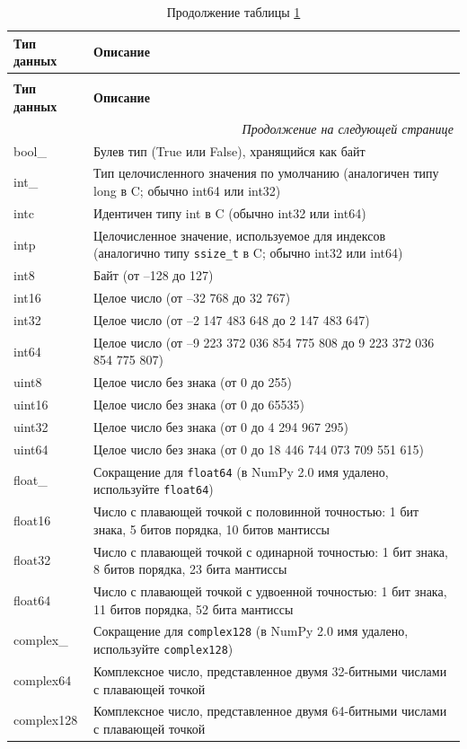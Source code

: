 \documentclass[pract]{SCWorks}
\begin{document}
\begin{longtable}{|p{2.4cm}|p{14cm}|}
\caption{Стандартные типы данных библиотеки NumPy} \label{tab:numpy-types} \\
\hline
\textbf{Тип данных} & \textbf{Описание} \\ \hline
\endfirsthead
\caption*{Продолжение таблицы \ref{tab:numpy-types}} \\
\hline
\textbf{Тип данных} & \textbf{Описание} \\ \hline
\endhead
\hline
\multicolumn{2}{r}{\textit{Продолжение на следующей странице}} \\
\endfoot
\endlastfoot

bool\_ & Булев тип (True или False), хранящийся как байт \\ \hline
int\_ & Тип целочисленного значения по умолчанию (аналогичен типу long в C; обычно int64 или int32) \\ \hline
intc & Идентичен типу int в C (обычно int32 или int64) \\ \hline
intp & Целочисленное значение, используемое для индексов (аналогично типу \texttt{ssize\_t} в C; обычно int32 или int64) \\ \hline
int8 & Байт (от –128 до 127) \\ \hline
int16 & Целое число (от –32 768 до 32 767) \\ \hline
int32 & Целое число (от –2 147 483 648 до 2 147 483 647) \\ \hline
int64 & Целое число (от –9 223 372 036 854 775 808 до 9 223 372 036 854 775 807) \\ \hline
uint8 & Целое число без знака (от 0 до 255) \\ \hline
uint16 & Целое число без знака (от 0 до 65535) \\ \hline
uint32 & Целое число без знака (от 0 до 4 294 967 295) \\ \hline
uint64 & Целое число без знака (от 0 до 18 446 744 073 709 551 615) \\ \hline
float\_ & Сокращение для \texttt{float64} (в NumPy 2.0 имя удалено, используйте \texttt{float64}) \\ \hline
float16 & Число с плавающей точкой с половинной точностью: 1 бит знака, 5 битов порядка, 10 битов мантиссы \\ \hline
float32 & Число с плавающей точкой с одинарной точностью: 1 бит знака, 8 битов порядка, 23 бита мантиссы \\ \hline
float64 & Число с плавающей точкой с удвоенной точностью: 1 бит знака, 11 битов порядка, 52 бита мантиссы \\ \hline
complex\_ & Сокращение для \texttt{complex128} (в NumPy 2.0 имя удалено, используйте \texttt{complex128}) \\ \hline
complex64 & Комплексное число, представленное двумя 32-битными числами с плавающей точкой \\ \hline
complex128 & Комплексное число, представленное двумя 64-битными числами с плавающей точкой \\ \hline
\end{longtable}
\end{document}
